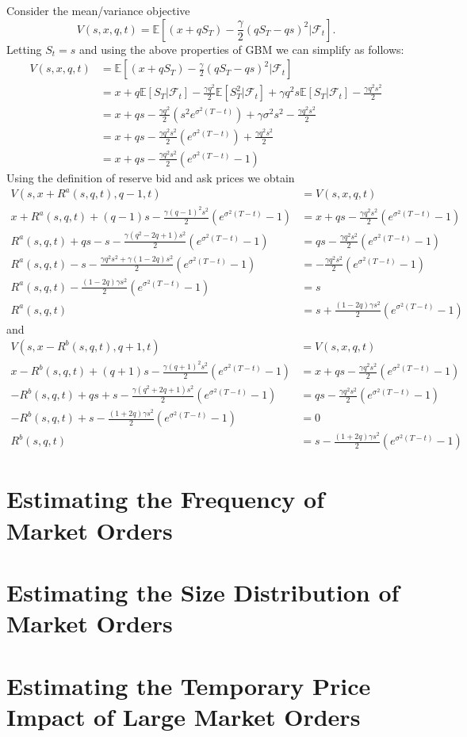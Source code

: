 Consider the mean/variance objective
\begin{equation}
    V(s,x,q,t)=\mathbb{E}\left[(x+qS_T)-\frac{\gamma}{2}(qS_T-qs)^2|\mathcal{F}_t\right].
\end{equation}
Letting $S_t=s$ and using the above properties of GBM we can simplify as follows:
\begin{align*}
    V(s,x,q,t)&=\mathbb{E}\left[(x+qS_T)-\frac{\gamma}{2}(qS_T-qs)^2|\mathcal{F}_t\right]\\
    &=x+q\mathbb{E}[S_T|\mathcal{F}_t]-\frac{\gamma q^2}{2}\mathbb{E}[S_T^2|\mathcal{F}_t]+\gamma q^2s\mathbb{E}[S_T|\mathcal{F}_t]-\frac{\gamma q^2s^2}{2}\\
    &=x+qs-\frac{\gamma q^2}{2}\left(s^2e^{\sigma^2(T-t)}\right)+\gamma\sigma^2s^2-\frac{\gamma q^2s^2}{2}\\
    &=x+qs-\frac{\gamma q^2s^2}{2}\left(e^{\sigma^2(T-t)}\right)+\frac{\gamma q^2s^2}{2}\\
    &=x+qs-\frac{\gamma q^2s^2}{2}\left(e^{\sigma^2(T-t)}-1\right)
\end{align*}
Using the definition of reserve bid and ask prices we obtain
\begin{align*}
    V(s,x+R^a(s,q,t),q-1,t)&=V(s,x,q,t)\\
    x+R^a(s,q,t)+(q-1)s-\frac{\gamma (q-1)^2s^2}{2}\left(e^{\sigma^2(T-t)}-1\right)&=x+qs-\frac{\gamma q^2s^2}{2}\left(e^{\sigma^2(T-t)}-1\right)\\
    R^a(s,q,t)+qs-s-\frac{\gamma (q^2-2q+1)s^2}{2}\left(e^{\sigma^2(T-t)}-1\right)&=qs-\frac{\gamma q^2s^2}{2}\left(e^{\sigma^2(T-t)}-1\right)\\
    R^a(s,q,t)-s-\frac{\gamma q^2s^2+\gamma(1-2q)s^2}{2}\left(e^{\sigma^2(T-t)}-1\right)&=-\frac{\gamma q^2s^2}{2}\left(e^{\sigma^2(T-t)}-1\right)\\
    R^a(s,q,t)-\frac{(1-2q)\gamma s^2}{2}\left(e^{\sigma^2(T-t)}-1\right)&=s\\
    R^a(s,q,t)&=s+ \frac{(1-2q)\gamma s^2}{2}\left(e^{\sigma^2(T-t)}-1\right)
\end{align*}
and
\begin{align*}
    V(s,x-R^b(s,q,t),q+1,t)&=V(s,x,q,t)\\
    x-R^b(s,q,t)+(q+1)s-\frac{\gamma (q+1)^2s^2}{2}\left(e^{\sigma^2(T-t)}-1\right)&=x+qs-\frac{\gamma q^2s^2}{2}\left(e^{\sigma^2(T-t)}-1\right)\\
    -R^b(s,q,t)+qs+s-\frac{\gamma (q^2+2q+1)s^2}{2}\left(e^{\sigma^2(T-t)}-1\right)&=qs-\frac{\gamma q^2s^2}{2}\left(e^{\sigma^2(T-t)}-1\right)\\
    -R^b(s,q,t)+s-\frac{(1+2q)\gamma s^2}{2}\left(e^{\sigma^2(T-t)}-1\right)&=0\\
    R^b(s,q,t)&=s- \frac{(1+2q)\gamma s^2}{2}\left(e^{\sigma^2(T-t)}-1\right)
\end{align*}
\section{Estimating the Frequency of Market Orders}
\section{Estimating the Size Distribution of Market Orders}
\section{Estimating the Temporary Price Impact of Large Market Orders}